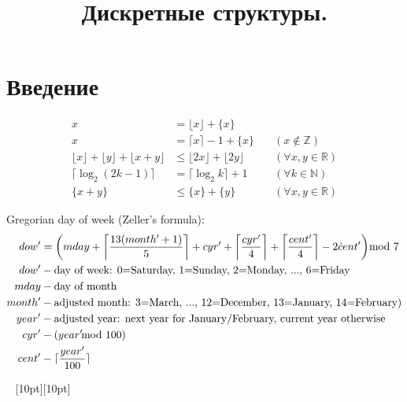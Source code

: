 \documentclass[a4paper,12pt]{article}
\title{Дискретные структуры.}
\author{}
\date{}
\numberwithin{figure}{section}
\begin{document}
\maketitle

\tableofcontents


\section{Введение}

\begin{align*}
	x & = \lfloor x \rfloor + \{ x \}					\\
	x & = \lceil x \rceil - 1 + \{ x \}
			\quad & (x \notin \mathbb{Z})				\\
	\lfloor x \rfloor + \lfloor y \rfloor + \lfloor x+y \rfloor
		& \leqslant \lfloor 2x \rfloor + \lfloor 2y \rfloor
			\quad & (\forall x,y \in \mathbb{R})		\\
	\lceil \log_2 (2k-1) \rceil & =  \lceil \log_2 k \rceil + 1
			\quad & (\forall k \in \mathbb{N})			\\
	\{ x + y \} & \leqslant \{ x \} + \{ y \}
			\quad & (\forall x,y \in \mathbb{R})
\end{align*}

Gregorian day of week (Zeller's formula):
\begin{align*}
	dow' &= \left( mday + \left\lceil \frac{13(month' + 1)}{5} \right\rceil
	             + cyr' + \left\lceil \frac{cyr'}{4} \right\rceil
	             + \left\lceil \frac{cent'}{4} \right\rceil - 2 \dot cent' \right)
	        \hspace{-.8em}\mod{7} \\
	dow' &- \text{day of week: 0=Saturday, 1=Sunday, 2=Monday, ..., 6=Friday} \\
	mday &- \text{day of month} \\
	month' &- \text{adjusted month: 3=March, ..., 12=December, 13=January, 14=February)} \\
	year' &- \text{adjusted year: next year for January/February, current year otherwise} \\
	cyr' &- (year' \hspace{-.8em}\mod 100) \\
	cent' &- \lceil \frac{year'}{100} \rceil
\end{align*}


\vspace{80pt} \noindent \hrulefill~ \raisebox{-8pt}[10pt][10pt]{\Large{}}~ \hrulefill
\end{document}
